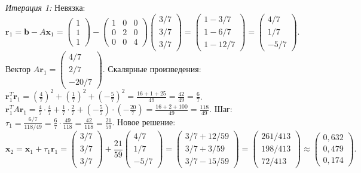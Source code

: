 \documentclass{article}
\begin{document}
\textit{Итерация 1:}
Невязка: $\textbf{r}_1 = \textbf{b} - A\textbf{x}_1 = \begin{pmatrix} 1 \\ 1 \\ 1 \end{pmatrix} - \begin{pmatrix} 1 & 0 & 0 \\ 0 & 2 & 0 \\ 0 & 0 & 4 \end{pmatrix} \begin{pmatrix} 3/7 \\ 3/7 \\ 3/7 \end{pmatrix} = \begin{pmatrix} 1 - 3/7 \\ 1 - 6/7 \\ 1 - 12/7 \end{pmatrix} = \begin{pmatrix} 4/7 \\ 1/7 \\ -5/7 \end{pmatrix}$.
Вектор $A\textbf{r}_1 = \begin{pmatrix} 4/7 \\ 2/7 \\ -20/7 \end{pmatrix}$.
Скалярные произведения:
$\textbf{r}_1^T \textbf{r}_1 = \left(\frac{4}{7}\right)^2 + \left(\frac{1}{7}\right)^2 + \left(-\frac{5}{7}\right)^2 = \frac{16 + 1 + 25}{49} = \frac{42}{49} = \frac{6}{7}$.
$\textbf{r}_1^T A \textbf{r}_1 = \frac{4}{7}\cdot\frac{4}{7} + \frac{1}{7}\cdot\frac{2}{7} + \left(-\frac{5}{7}\right)\cdot\left(-\frac{20}{7}\right) = \frac{16 + 2 + 100}{49} = \frac{118}{49}$.
Шаг: $\tau_1 = \frac{6/7}{118/49} = \frac{6}{7} \cdot \frac{49}{118} = \frac{42}{118} = \frac{21}{59}$.
Новое решение:
$$\textbf{x}_2 = \textbf{x}_1 + \tau_1 \textbf{r}_1 = \begin{pmatrix} 3/7 \\ 3/7 \\ 3/7 \end{pmatrix} + \frac{21}{59} \begin{pmatrix} 4/7 \\ 1/7 \\ -5/7 \end{pmatrix} = \begin{pmatrix} 3/7 + 12/59 \\ 3/7 + 3/59 \\ 3/7 - 15/59 \end{pmatrix} = \begin{pmatrix} 261/413 \\ 198/413 \\ 72/413 \end{pmatrix} \approx \begin{pmatrix} 0,632 \\ 0,479 \\ 0,174 \end{pmatrix}.$$
\end{document}
